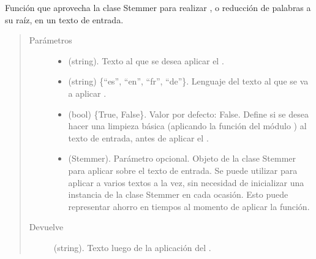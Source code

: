 \documentclass[letterpaper,10pt,openany,spanish]{sphinxmanual}
\begin{document}

\begin{fulllineitems}
\label{\detokenize{funciones/stemming:stemming.stem_texto}}
Función que aprovecha la clase Stemmer para realizar , o         reducción de palabras a su raíz, en un texto de entrada.
\begin{quote}\begin{description}
\item[{Parámetros}] \leavevmode\begin{itemize}
\item {} 
 \textendash{} (string). Texto al que se desea aplicar el .

\item {} 
 \textendash{} (string) \{“es”, “en”, “fr”, “de”\}. Lenguaje del         texto al que se va a aplicar .

\item {} 
 \textendash{} (bool) \{True, False\}. Valor por defecto: False. Define         si se desea hacer una limpieza básica (aplicando la función           del módulo ) al texto de entrada,          antes de aplicar el .

\item {} 
 \textendash{} (Stemmer). Parámetro opcional. Objeto de la clase Stemmer para aplicar          sobre el texto de entrada. Se puede utilizar para aplicar          a varios textos a la vez, sin necesidad de inicializar una         instancia de la clase Stemmer en cada ocasión. Esto puede representar         ahorro en tiempos al momento de aplicar la función.

\end{itemize}

\item[{Devuelve}] \leavevmode
(string). Texto luego de la aplicación del .

\end{description}\end{quote}

\end{fulllineitems}
\end{document}
